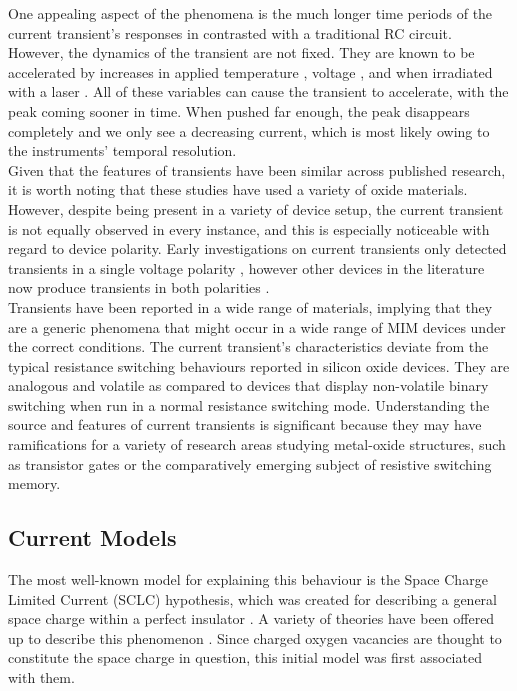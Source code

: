 \noindent One appealing aspect of the phenomena is the much longer time periods of the current transient's responses in contrasted with a traditional RC circuit. However, the dynamics of the transient are not fixed. They are known to be accelerated by increases in applied temperature \cite{manceau2007metal}, voltage \cite{zafar1998oxygen}, and when irradiated with a laser \cite{li2015visible}. All of these variables can cause the transient to accelerate, with the peak coming sooner in time. When pushed far enough, the peak disappears completely and we only see a decreasing current, which is most likely owing to the instruments' temporal resolution. \\

\noindent Given that the features of transients have been similar across published research, it is worth noting that these studies have used a variety of oxide materials. However, despite being present in a variety of device setup, the current transient is not equally observed in every instance, and this is especially noticeable with regard to device polarity. Early investigations on current transients only detected transients in a single voltage polarity \cite{manceau2007current}, however other devices in the literature now produce transients in both polarities \cite{chen2010observation}. \\

\noindent Transients have been reported in a wide range of materials, implying that they are a generic phenomena that might occur in a wide range of MIM devices under the correct conditions. The current transient's characteristics deviate from the typical resistance switching behaviours reported in silicon oxide devices. They are analogous and volatile as compared to devices that display non-volatile binary switching when run in a normal resistance switching mode. Understanding the source and features of current transients is significant because they may have ramifications for a variety of research areas studying metal-oxide structures, such as transistor gates or the comparatively emerging subject of resistive switching memory.

\subsection[Current Models]{Current Models}
The most well-known model for explaining this behaviour is the Space Charge Limited Current (SCLC) hypothesis, which was created for describing a general space charge within a perfect insulator \cite{many1962theory}. A variety of theories have been offered up to describe this phenomenon \cite{lampert1970current}. Since charged oxygen vacancies are thought to constitute the space charge in question, this initial model was first associated with them. \\

